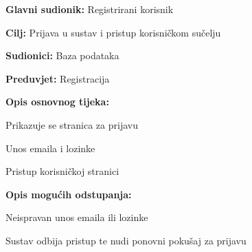 					\eject
					
					\noindent {}
					\begin{packed_item}
						
						\item \textbf{Glavni sudionik: }Registrirani korisnik
						\item  \textbf{Cilj:} Prijava u sustav i pristup korisničkom sučelju 
						\item  \textbf{Sudionici:} Baza podataka
						\item  \textbf{Preduvjet:} Registracija
						\item  \textbf{Opis osnovnog tijeka:}
						
						\item[] \begin{packed_enum}
							
							\item Prikazuje se stranica za prijavu
							\item Unos emaila i lozinke
							\item Pristup korisničkoj stranici
							
						\end{packed_enum}
						
						\item  \textbf{Opis mogućih odstupanja:}
						
						\item[] \begin{packed_item}
							
							\item[2.a] Neispravan unos emaila ili lozinke
							\item[] \begin{packed_enum}
								
								\item Sustav odbija pristup te nudi ponovni pokušaj za prijavu
								
							\end{packed_enum}
						\end{packed_item}
					\end{packed_item}
					
